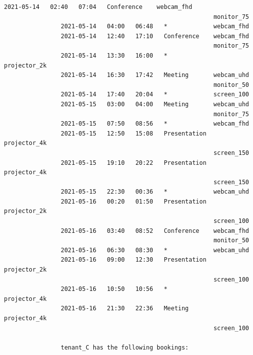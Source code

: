 \documentclass{article}
\begin{document}
\begin{Verbatim}[gobble=8]
                2021-05-14   02:40   07:04   Conference    webcam_fhd
                                                           monitor_75
                2021-05-14   04:00   06:48   *             webcam_fhd
                2021-05-14   12:40   17:10   Conference    webcam_fhd
                                                           monitor_75
                2021-05-14   13:30   16:00   *             projector_2k
                2021-05-14   16:30   17:42   Meeting       webcam_uhd
                                                           monitor_50
                2021-05-14   17:40   20:04   *             screen_100
                2021-05-15   03:00   04:00   Meeting       webcam_uhd
                                                           monitor_75
                2021-05-15   07:50   08:56   *             webcam_fhd
                2021-05-15   12:50   15:08   Presentation  projector_4k
                                                           screen_150
                2021-05-15   19:10   20:22   Presentation  projector_4k
                                                           screen_150
                2021-05-15   22:30   00:36   *             webcam_uhd
                2021-05-16   00:20   01:50   Presentation  projector_2k
                                                           screen_100
                2021-05-16   03:40   08:52   Conference    webcam_fhd
                                                           monitor_50
                2021-05-16   06:30   08:30   *             webcam_uhd
                2021-05-16   09:00   12:30   Presentation  projector_2k
                                                           screen_100
                2021-05-16   10:50   10:56   *             projector_4k
                2021-05-16   21:30   22:36   Meeting       projector_4k
                                                           screen_100
                
                tenant_C has the following bookings:
                

\end{Verbatim}
\end{document}
